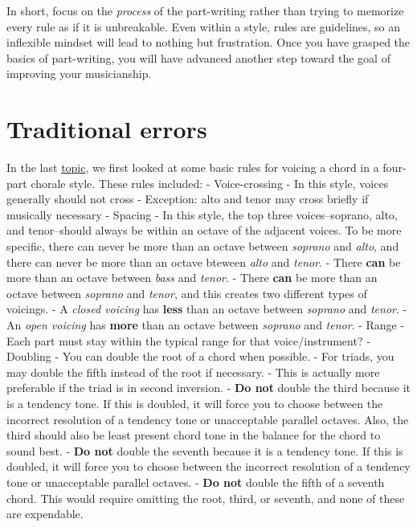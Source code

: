 \documentclass{book}
\begin{document}
In short, focus on the \emph{process} of the part-writing rather than trying
to memorize every rule as if it is unbreakable. Even within a style, rules are
guidelines, so an inflexible mindset will lead to nothing but frustration.
Once you have grasped the basics of part-writing, you will have advanced
another step toward the goal of improving your musicianship.

\hypertarget{traditional-errors}{%
\section{Traditional errors}\label{traditional-errors}}

In the last \href{10-intro-harmonic/a1-voiceleadingerrors.html}{topic}, we
first looked at some basic rules for voicing a chord in a four-part chorale
style. These rules included: - Voice-crossing - In this style, voices
generally should not cross - Exception: alto and tenor may cross briefly if
musically necessary - Spacing - In this style, the top three voices--soprano,
alto, and tenor--should always be within an octave of the adjacent voices. To
be more specific, there can never be more than an octave between
\emph{soprano} and \emph{alto}, and there can never be more than an octave
bteween \emph{alto} and \emph{tenor}. - There \textbf{can} be more than an
octave between \emph{bass} and \emph{tenor}. - There \textbf{can} be more than
an octave between \emph{soprano} and \emph{tenor}, and this creates two
different types of voicings. - A \emph{closed voicing} has \textbf{less} than
an octave between \emph{soprano} and \emph{tenor}. - An \emph{open voicing}
has \textbf{more} than an octave between \emph{soprano} and \emph{tenor}. -
Range - Each part must stay within the typical range for that
voice/instrument? - Doubling - You can double the root of a chord when
possible. - For triads, you may double the fifth instead of the root if
necessary. - This is actually more preferable if the triad is in second
inversion. - \textbf{Do not} double the third because it is a tendency tone.
If this is doubled, it will force you to choose between the incorrect
resolution of a tendency tone or unacceptable parallel octaves. Also, the
third should also be least present chord tone in the balance for the chord to
sound best. - \textbf{Do not} double the seventh because it is a tendency
tone. If this is doubled, it will force you to choose between the incorrect
resolution of a tendency tone or unacceptable parallel octaves. - \textbf{Do
not} double the fifth of a seventh chord. This would require omitting the
root, third, or seventh, and none of these are expendable.
\end{document}
